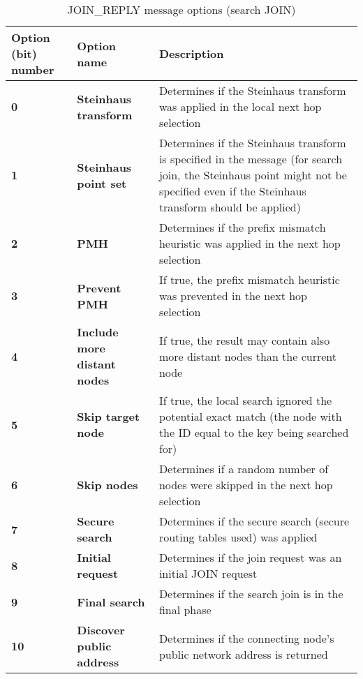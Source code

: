 \begin{table}[H]
\scriptsize
\begin{center}
\begin{tabular}{p{2.7cm} p{3.3cm} p{8.5cm}}
	\hline
	\textbf{Option (bit) number}			& \textbf{Option name}					& \textbf{Description}				\\[1mm]
    \hline
	\textbf{0}								& \textbf{Steinhaus transform}			& Determines if the Steinhaus transform was applied	in the local next hop selection				\\[1.5mm]
	\textbf{1}								& \textbf{Steinhaus point set}			& Determines if the Steinhaus transform is specified in the message	(for search join, the Steinhaus point might not be specified even if the Steinhaus transform should be applied)					\\[1.5mm]
    \textbf{2}								& \textbf{PMH}							& Determines if the prefix mismatch heuristic was applied in the next hop selection				\\[1.5mm]
	\textbf{3}								& \textbf{Prevent PMH}					& If true, the prefix mismatch heuristic was prevented in the next hop selection			\\[1.5mm]
	\textbf{4}								& \textbf{Include more distant nodes}	& If true, the result may contain also more distant nodes than the current node			\\[1.5mm]
	\textbf{5}								& \textbf{Skip target node}				& If true, the local search ignored the potential exact match (the node with the ID equal to the key being searched for)			\\[1.5mm]
	\textbf{6}								& \textbf{Skip nodes}					& Determines if a random number of nodes were skipped in the next hop selection					\\[1.5mm]
	\textbf{7}								& \textbf{Secure search}				& Determines if the secure search (secure routing tables used) was applied						\\[1.5mm]
	\textbf{8}								& \textbf{Initial request}				& Determines if the join request was an initial JOIN request									\\[1.5mm]	
	\textbf{9}								& \textbf{Final search}					& Determines if the search join is in the final phase											\\[1.5mm]	
	\textbf{10}								& \textbf{Discover public address}		& Determines if the connecting node's public network address is returned						\\[1.5mm]
    \hline
\end{tabular}
\end{center}
\caption{JOIN\_REPLY message options (search JOIN)}
\label{tab:mSearchJoinReplyOptions}
\end{table}














